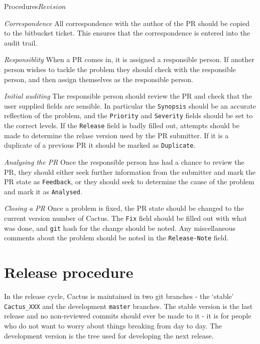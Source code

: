 \begin{cactuspart}{2}{Procedures}{}{$Revision$}
\begin{Lentry}
\item[{\em Correspondence}]
All correspondence with the author of the PR should be copied to the
bitbucket ticket.
This ensures that the correspondence is entered into the audit trail.
\item[{\em Responsiblity}]
When a PR comes in, it is assigned a responsible person.  If another
person wishes to tackle the problem they should check with the
responsible person, and then assign themselves as the responsible
person.
\item[{\em Initial auditing}]
The responsible person should review the PR and check that the user
supplied fields are sensible.  In particular the {\tt Synopsis} should
be an accurate reflection of the problem, and the {\tt Priority} and
{\tt Severity} fields should be set to the correct levels.  If the
{\tt Release} field is badly filled out, attempts should be made to
determine the relase version used by the PR submitter.  If it is a
duplicate of a previous PR it should be marked as {\tt Duplicate}.
\item[{\em Analysing the PR}]
Once the responsible person has had a chance to review the PR, they
should either seek further information from the submitter and mark the 
PR state as {\tt Feedback}, or they should seek to determine the cause 
of the problem and mark it as {\tt Analysed}.
\item[{\em Closing a PR}]
Once a problem is fixed, the PR state should be changed to the current 
version number of Cactus.  The {\tt Fix} field should be filled out
with what was done, and {\tt git} hash for the change
should be noted.  Any miscellaneous comments about the problem
should be noted in the {\tt Release-Note} field.
\end{Lentry}


\chapter{Release procedure}

In the release cycle, Cactus is maintained in two git
branches - the `stable' \verb.Cactus_XXX. and the development
\verb.master. branches.  The stable version is the last release and
no non-reviewed commits should ever be made to it - it is for people who do
not
want to worry about things breaking from day to day.  The development
version is the tree used for developing the next release.


\end{cactuspart}

